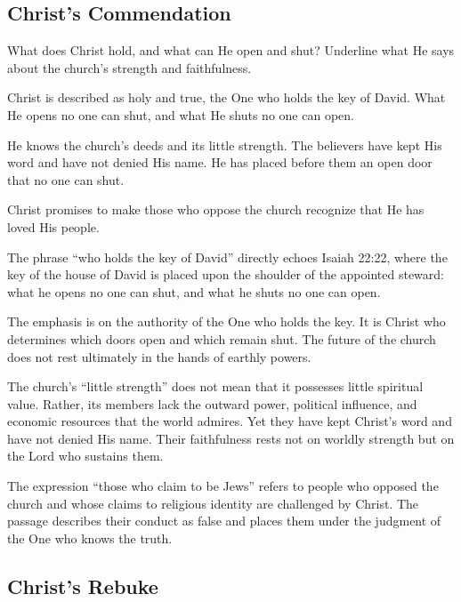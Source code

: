 \subsection{Christ's Commendation}

\begin{ScriptureBox2}{What does Christ hold, and what can He open and shut? Underline what He says about the church's strength and faithfulness.}
\item[3:7] Christ is described as holy and true, the One who holds the key of David. What He opens no one can shut, and what He shuts no one can open.

\item[3:8] He knows the church's deeds and its little strength. The believers have kept His word and have not denied His name. He has placed before them an open door that no one can shut.

\item[3:9] Christ promises to make those who oppose the church recognize that He has loved His people.
\end{ScriptureBox2}

The phrase ``who holds the key of David'' directly echoes Isaiah 22:22, where the key of the house of David is placed upon the shoulder of the appointed steward: what he opens no one can shut, and what he shuts no one can open.

The emphasis is on the authority of the One who holds the key. It is Christ who determines which doors open and which remain shut. The future of the church does not rest ultimately in the hands of earthly powers.

The church's ``little strength'' does not mean that it possesses little spiritual value. Rather, its members lack the outward power, political influence, and economic resources that the world admires. Yet they have kept Christ's word and have not denied His name. Their faithfulness rests not on worldly strength but on the Lord who sustains them.

The expression ``those who claim to be Jews'' refers to people who opposed the church and whose claims to religious identity are challenged by Christ. The passage describes their conduct as false and places them under the judgment of the One who knows the truth.

\subsection{Christ's Rebuke}

